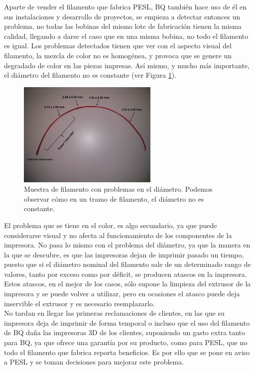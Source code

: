 Aparte de vender el filamento que fabrica PESL, BQ también hace uso de él en sus instalaciones y desarrollo de proyectos, se empieza a detectar entonces un problema, no todas las bobinas del mismo lote de fabricación tienen la misma calidad, llegando a darse el caso que en una misma bobina, no todo el filamento es igual. Los problemas detectados tienen que ver con el aspecto visual del filamento, la mezcla de color no es homogénea, y provoca que se genere un degradado de color en las piezas impresas. Así mismo, y mucho más importante, el diámetro del filamento no es constante (ver Figura \ref{fig:muestra_filamento}).

\begin{figure}[!ht]
    \centering
    \includegraphics[width=0.6\textwidth]{images/atasco_rojo.jpg}
    \caption[Muestra de filamento con problemas en el diámetro]{Muestra de filamento con problemas en el diámetro. Podemos observar cómo en un tramo de filamento, el diámetro no es constante.}
    \label{fig:muestra_filamento}
\end{figure}

El problema que se tiene en el color, es algo secundario, ya que puede considerarse visual y no afecta al funcionamiento de los componentes de la impresora. No pasa lo mismo con el problema del diámetro, ya que la manera en la que se descubre, es que las impresoras dejan de imprimir pasado un tiempo, puesto que si el diámetro nominal del filamento sale de un determinado rango de valores, tanto por exceso como por déficit, se producen atascos en la impresora. Estos atascos, en el mejor de los casos, sólo supone la limpieza del extrusor de la impresora y se puede volver a utilizar, pero en ocasiones el atasco puede deja inservible el extrusor y es necesario reemplazarlo.\\

No tardan en llegar las primeras reclamaciones de clientes, en las que su impresora deja de imprimir de forma temporal o incluso que el uso del filamento de BQ daña las impresoras 3D de los clientes, suponiendo un gasto extra tanto para BQ, ya que ofrece una garantía por su producto, como para PESL, que no todo el filamento que fabrica reporta beneficios. Es por ello que se pone en aviso a PESL y se toman decisiones para mejorar este problema.\\

